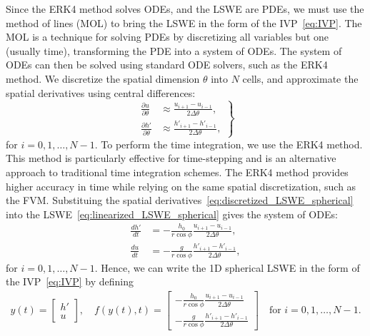Since the ERK4 method solves ODEs, and the LSWE are PDEs, we must use the method of lines (MOL) to bring the LSWE in the form of the IVP~\eqref{eq:IVP}.
The MOL is a technique for solving PDEs by discretizing all variables but one (usually time), transforming the PDE into a system of ODEs.
The system of ODEs can then be solved using standard ODE solvers, such as the ERK4 method.
We discretize the spatial dimension $\theta$ into $N$ cells, and approximate the spatial derivatives using central differences:
\begin{equation}\label{eq:discretized_LSWE_spherical}
    \left.
    \begin{aligned}
        \frac{\partial u}{\partial \theta} &\approx \frac{u_{i+1} - u_{i-1}}{2 \Delta \theta}, \\
        \frac{\partial h'}{\partial \theta} &\approx \frac{h'_{i+1} - h'_{i-1}}{2 \Delta \theta},
    \end{aligned}
    \right\}
\end{equation}
for $i = 0,1, \dots, N-1$.
To perform the time integration, we use the ERK4 method.
This method is particularly effective for time-stepping and is an alternative approach to traditional time integration schemes.
The ERK4 method provides higher accuracy in time while relying on the same spatial discretization, such as the FVM.
Substituing the spatial derivatives~\eqref{eq:discretized_LSWE_spherical} into the LSWE~\eqref{eq:linearized_LSWE_spherical} gives the system of ODEs:
\begin{equation}\label{eq:ODE_LSWE_spherical}
    \begin{aligned}
        \frac{d h'}{dt} &= -\frac{h_0}{r \cos\phi} \frac{u_{i+1} - u_{i-1}}{2 \Delta \theta}, \\
        \frac{d u}{dt} &= -\frac{g}{r \cos\phi} \frac{h'_{i+1} - h'_{i-1}}{2 \Delta \theta},
    \end{aligned}
\end{equation}
for $i = 0,1, \dots, N-1$.
Hence, we can write the 1D spherical LSWE in the form of the IVP~\eqref{eq:IVP} by defining 
\begin{align}\label{eq:IVP_LSWE_spherical}
    y(t) = \begin{bmatrix}
        h' \\ u
    \end{bmatrix},
    \quad 
    f(y(t),t) = \begin{bmatrix}
        -\frac{h_0}{r \cos\phi} \frac{u_{i+1} - u_{i-1}}{2 \Delta \theta} \\ -\frac{g}{r \cos\phi} \frac{h'_{i+1} - h'_{i-1}}{2 \Delta \theta}
    \end{bmatrix}
    \quad \text{for } i = 0,1, \dots, N-1. 
\end{align}
